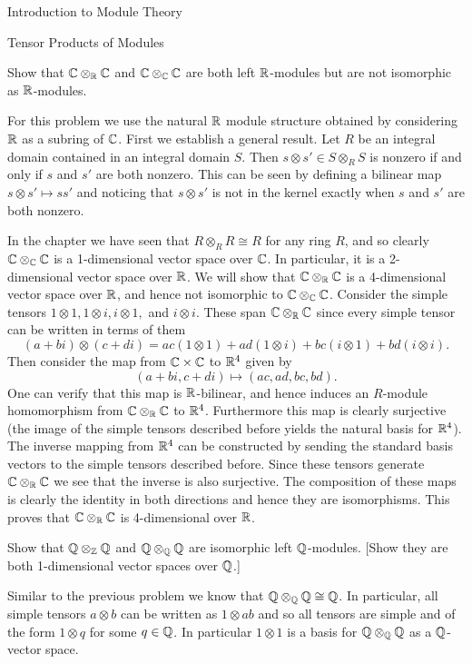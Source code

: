 \begin{chapter}{Introduction to Module Theory}
\begin{section}{Tensor Products of Modules}
\begin{solution}
\end{solution}\oneperpage



\begin{problem}\label{ex:10.4.3}
Show that $\mathbb{C}\otimes_{\mathbb{R}}\mathbb{C}$ and $\mathbb{C}\otimes _{\mathbb{C}}\mathbb{C}$ are both left $\mathbb{R}$-modules but are not isomorphic as $\mathbb{R}$-modules.
\end{problem}
\begin{solution}
For this problem we use the natural $\mathbb{R}$ module structure obtained by considering $\mathbb{R}$ as a subring of $\mathbb{C}$. First we establish a general result. Let $R$ be an integral domain contained in an integral domain $S$. Then $s\otimes s' \in S\otimes_R S$ is nonzero if and only if $s$ and $s'$ are both nonzero. This can be seen by defining a bilinear map $s\otimes s'\mapsto ss'$ and noticing that $s\otimes s'$ is not in the kernel exactly when $s$ and $s'$ are both nonzero. 

In the chapter we have seen that $R\otimes_R R \cong R$ for any ring $R$, and so clearly $\mathbb{C}\otimes_{\mathbb{C}} \mathbb{C}$ is a 1-dimensional vector space over $\mathbb{C}$. In particular, it is a 2-dimensional vector space over $\mathbb{R}$. We will show that $\mathbb{C}\otimes_{\mathbb{R}}\mathbb{C}$ is a 4-dimensional vector space over $\mathbb{R}$, and hence not isomorphic to $\mathbb{C}\otimes_{\mathbb{C}}\mathbb{C}$. Consider the simple tensors $1\otimes 1, 1\otimes i, i\otimes 1, $ and $i\otimes i$. These span $\mathbb{C}\otimes_{\mathbb{R}}\mathbb{C}$ since every simple tensor can be written in terms of them \[
(a+bi)\otimes (c+di) = ac(1\otimes 1) + ad(1\otimes i) + bc(i\otimes 1) + bd(i\otimes i).
\]
Then consider the map from $\mathbb{C}\times \mathbb{C}$ to $\mathbb{R}^4$ given by \[
 (a+bi, c+di) \mapsto (ac,ad,bc,bd).
\]
One can verify that this map is $\mathbb{R}$-bilinear, and hence induces an $R$-module homomorphism from $\mathbb{C}\otimes_{\mathbb{R}}\mathbb{C}$ to $\mathbb{R}^4$. Furthermore this map is clearly surjective (the image of the simple tensors described before yields the natural basis for $\mathbb{R}^4$). The inverse mapping from $\mathbb{R}^4$ can be constructed by sending the standard basis vectors to the simple tensors described before. Since these tensors generate $\mathbb{C}\otimes_{\mathbb{R}}\mathbb{C}$ we see that the inverse is also surjective. The composition of these maps is clearly the identity in both directions and hence they are isomorphisms. This proves that $\mathbb{C}\otimes_{\mathbb{R}}\mathbb{C}$ is 4-dimensional over $\mathbb{R}$.
\end{solution}\oneperpage



\begin{problem}\label{ex:10.4.4}
Show that $\mathbb{Q}\otimes_{\mathbb{Z}}\mathbb{Q}$ and $\mathbb{Q}\otimes_{\mathbb{Q}}\mathbb{Q}$ are isomorphic left $\mathbb{Q}$-modules. [Show they are both 1-dimensional vector spaces over $\mathbb{Q}$.]
\end{problem}
\begin{solution}Similar to the previous problem we know that $\mathbb{Q}\otimes_{\mathbb{Q}}\mathbb{Q} \cong \mathbb{Q}$. In particular, all simple tensors $a\otimes b$ can be written as $1\otimes ab$ and so all tensors are simple and of the form $1\otimes q$ for some $q\in \mathbb{Q}$. In particular $1\otimes 1$ is a basis for $\mathbb{Q}\otimes_{\mathbb{Q}}\mathbb{Q}$ as a $\mathbb{Q}$-vector space. 


\end{solution}
\end{section}
\end{chapter}
